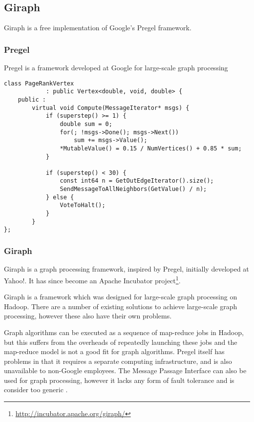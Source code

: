 \subsection{Giraph}
Giraph is a free implementation of Google's Pregel framework.

\subsubsection{Pregel}
Pregel is a framework developed at Google for large-scale graph processing \cite{pregel}

\begin{lstlisting}
class PageRankVertex
			: public Vertex<double, void, double> {
	public :	
		virtual void Compute(MessageIterator* msgs) {
			if (superstep() >= 1) {
				double sum = 0;
				for(; !msgs->Done(); msgs->Next())
					sum += msgs->Value();
				*MutableValue() = 0.15 / NumVertices() + 0.85 * sum;
			}
			
			if (superstep() < 30) {
				const int64 n = GetOutEdgeIterator().size();
				SendMessageToAllNeighbors(GetValue() / n);
			} else {
				VoteToHalt();
			}
		}
};					
\end{lstlisting}

\subsubsection{Giraph}
Giraph is a graph processing framework, inspired by Pregel, initially developed at Yahoo!. It has since become an Apache Incubator project\footnote{\url{http://incubator.apache.org/giraph/}}.

Giraph is a framework which was designed for large-scale graph processing on Hadoop. There are a number of existing solutions to achieve large-scale graph processing, however these also have their own problems.

Graph algorithms can be executed as a sequence of map-reduce jobs in Hadoop, but this suffers from the overheads of repeatedly launching these jobs and the map-reduce model is not a good fit for graph algorithms. Pregel itself has problems in that it requires a separate computing infrastructure, and is also unavailable to non-Google employees. The Message Passage Interface can also be used for graph processing, however it lacks any form of fault tolerance and is consider too generic \cite{giraphtalk}.



